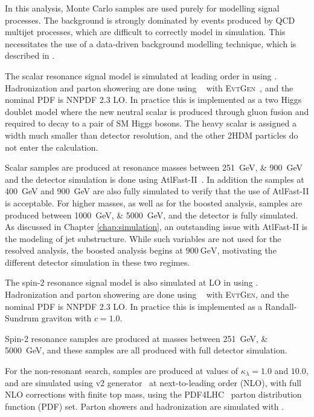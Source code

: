 In this analysis, Monte Carlo samples are used purely for modelling signal
processes. The background is strongly dominated by events produced by QCD
multijet processes, which are difficult to correctly model in simulation. This
necessitates the use of a data-driven background modelling technique, which is
described in \Sect{\ref{sec:bkgdestimation}}.

The scalar resonance signal model is simulated at leading order in \alphas using
\MADGRAPH\cite{MG5}. Hadronization and parton showering are done using
\HERWIG[7]~\cite{Herwig7}\cite{HerwigPP} with \textsc{EvtGen}~\cite{EvtGen},
and the nominal PDF is NNPDF 2.3 LO. In practice this is implemented as a two
Higgs doublet model where the new neutral scalar is produced through gluon
fusion and required to decay to a pair of SM Higgs bosons. The heavy scalar is
assigned a width much smaller than detector resolution, and the other 2HDM
particles do not enter the calculation.

Scalar samples are produced at resonance masses between \SIlist{251;900}{\GeV} and the detector
simulation is done using AtlFast-II~\cite{SOFT-2010-01}. In addition the samples at \SI{400}{\GeV}
and \SI{900}{\GeV} are also fully simulated to verify that the use of AtlFast-II
is acceptable. For higher masses, as well as for the boosted analysis, 
samples are produced between \SIlist{1000;5000}{\GeV}, and the detector is fully simulated.
As discussed in Chapter \ref{chap:simulation}, an outstanding issue with AtlFast-II is the 
modeling of jet substructure. While such variables are not used for the resolved analysis,
the boosted analysis begins at $\SI{900}{\GeV}$, motivating the different detector 
simulation in these two regimes.

The spin-2 resonance signal model is also simulated at LO in \alphas using
\MADGRAPH. Hadronization and parton showering are done using
\PYTHIA[8]~\cite{Pythia} with \textsc{EvtGen}, and the nominal PDF is NNPDF 2.3
LO. In practice this is implemented as a Randall-Sundrum graviton with $c=1.0$.

Spin-2 resonance samples are produced at masses between \SIlist{251;5000}{\GeV}, 
and these samples are all produced with full detector simulation.

For the non-resonant search, samples are produced at values of $\kappa_{\lambda} = 1.0$ and $10.0$, and are simulated
using \POWHEGBOX v2 generator~\cite{Powheg1, Powheg2, Powheg3} at next-to-leading order (NLO), with full 
NLO corrections with finite top mass, using the PDF4LHC~\cite{Butterworth:2015oua} parton distribution 
function (PDF) set. Parton showers and hadronization are simulated with \PYTHIA[8].

